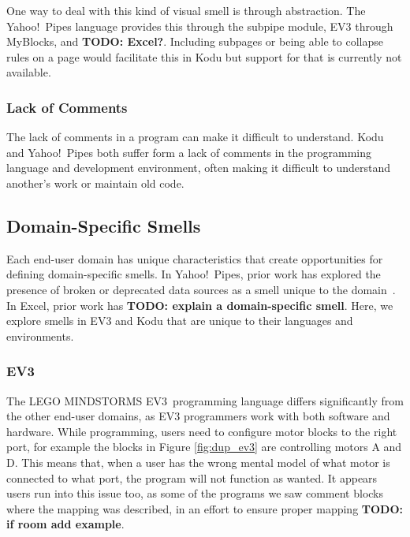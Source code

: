\documentclass{sig-alternate}
\newcommand{\todo}[1]{\textbf{TODO: #1}}
\newcommand{\ms}{LEGO MINDSTORMS EV3}
\begin{document}
	One way to deal with this kind of visual smell is through abstraction. The  Yahoo!\ Pipes language provides this through the subpipe module, EV3 through MyBlocks, and \todo{Excel?}.  Including subpages or being able to collapse rules on a page would facilitate this in Kodu but support for that is currently not available. 


	\subsubsection{Lack of Comments}
	The lack of comments in a program can make it difficult to understand. Kodu and Yahoo!\ Pipes both suffer form a lack of comments
	in the programming language and development environment, often making it difficult to understand another's work or maintain old code. 



\subsection{Domain-Specific Smells}
Each end-user domain has unique characteristics that create opportunities for defining domain-specific smells. In Yahoo!\ Pipes, prior work has explored the presence of broken or deprecated data sources as a smell unique to the domain~\cite{StoleeTSE2013}. In Excel, prior work has \todo{explain a domain-specific smell}. Here, we explore smells in EV3 and Kodu that are unique to their languages and environments. 


\subsubsection{EV3}
The \ms~programming language differs significantly from the other end-user domains, as EV3 programmers work with both software and hardware. While programming, users need to configure motor blocks to the right port, for example the blocks in Figure \ref{fig:dup_ev3} are controlling motors A and D. This means that, when a user has the wrong mental model of what motor is connected to what port, the program will not function as wanted. It appears users run into this issue too, as some of the programs we saw comment blocks where the mapping was described, in an effort to ensure proper mapping \todo{if room add example}.
\end{document}
